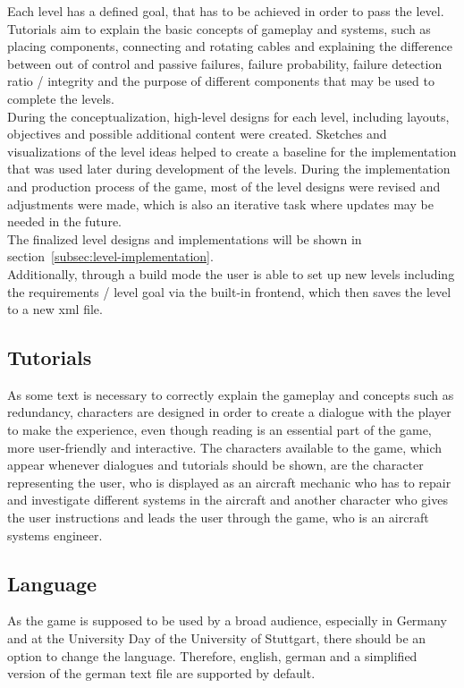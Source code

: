 Each level has a defined goal, that has to be achieved in order to pass the level.
Tutorials aim to explain the basic concepts of gameplay and systems, such as placing components, connecting and rotating cables and
explaining the difference between out of control and passive failures, failure probability, failure detection ratio / integrity and the purpose
of different components that may be used to complete the levels.
\\
During the conceptualization, high-level designs for each level, including layouts, objectives and possible additional content were created.
Sketches and visualizations of the level ideas helped to create a baseline for the implementation that was used later during development of the levels.
During the implementation and production process of the game, most of the level designs were revised and adjustments were made, which is also
an iterative task where updates may be needed in the future.
\\
The finalized level designs and implementations will be shown in section~\ref{subsec:level-implementation}.
\\
Additionally, through a build mode the user is able to set up new levels including the requirements / level goal via the built-in
frontend, which then saves the level to a new xml file.

\subsection{Tutorials}\label{subsec:tutorials}
As some text is necessary to correctly explain the gameplay and concepts such as redundancy, characters are designed in order to create
a dialogue with the player to make the experience, even though reading is an essential part of the game, more user-friendly and interactive.
The characters available to the game, which appear whenever dialogues and tutorials should be shown, are the character representing the user, who is displayed
as an aircraft mechanic who has to repair and investigate different systems in the aircraft and another character who gives the user instructions and
leads the user through the game, who is an aircraft systems engineer.

\subsection{Language}\label{subsec:language}
As the game is supposed to be used by a broad audience, especially in Germany and at the University Day of the University of Stuttgart, there should be an option
to change the language.
Therefore, english, german and a simplified version of the german text file are supported by default.